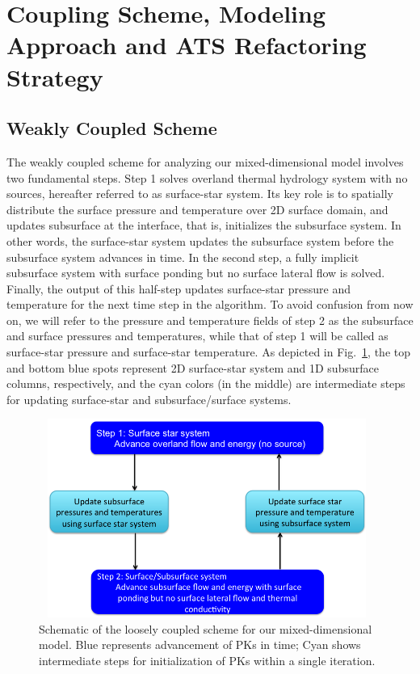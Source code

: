 \documentclass[review]{elsarticle}
\begin{document}
\section{Coupling Scheme, Modeling Approach and ATS Refactoring Strategy}\label{mixed-dim-model}
\subsection{Weakly Coupled Scheme}
The weakly coupled scheme for analyzing our mixed-dimensional model involves two fundamental steps. Step 1 solves overland thermal hydrology system with no sources, hereafter referred to as surface-star system. Its key role is to spatially distribute the surface pressure and temperature over 2D surface domain, and updates subsurface at the interface, that is, initializes the subsurface system. In other words, the surface-star system updates the subsurface system before the subsurface system advances in time. In the second step, a fully implicit subsurface system with surface ponding but no surface lateral flow is solved. Finally, the output of this half-step updates surface-star pressure and temperature for the next time step in the algorithm. To avoid confusion from now on, we will refer to the pressure and temperature fields of step 2 as the subsurface and surface pressures and temperatures, while that of step 1 will be called as surface-star pressure and surface-star temperature. As depicted in Fig.~\ref{coupling-schematic}, the top and bottom blue spots represent 2D surface-star system and 1D subsurface columns, respectively, and the cyan colors (in the middle) are intermediate steps for updating surface-star and subsurface/surface systems.


\begin{figure}[!htpb]
\centering
\includegraphics[height = 6.5cm, width=11cm]{figures/shematic-couplingscheme1.png}
\caption{Schematic of the loosely coupled scheme for our mixed-dimensional model. Blue represents advancement of PKs in time; Cyan shows intermediate steps for initialization of PKs within a single iteration.}
\label{coupling-schematic}
\end{figure}
\end{document}
